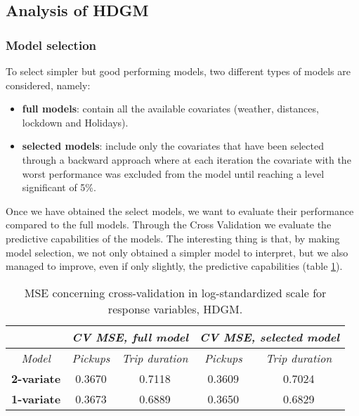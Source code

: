 
\subsection{Analysis of HDGM}
\subsubsection{Model selection} To select simpler but good performing models, two different types of models are considered, namely:
\begin{itemize}
	\item \textbf{full models}: contain all the available covariates (weather, distances, lockdown and Holidays).
	\item \textbf{selected models}: include only the covariates that have been selected through a backward approach where at each iteration the covariate with the worst performance was excluded from the model until reaching a level significant of \num{5}\%.
\end{itemize}
Once we have obtained the select models, we want to evaluate their performance compared to the full models. Through the Cross Validation we evaluate the predictive capabilities of the models. The interesting thing is that, by making model selection, we not only obtained a simpler model to interpret, but we also managed to improve, even if only slightly, the predictive capabilities (table \ref{Cross-validation mean squared errors HDGM}).
 
\begin{table}
	\centering
	\renewcommand\arraystretch{1.3}
	\begin{tabular}{c|cc|cc}
		\hline
		\multicolumn{1}{l|}{} & \multicolumn{2}{c|}{\textit{CV MSE, full model}} & \multicolumn{2}{c}{\textit{CV MSE, selected model} }\\ 
		\hline
		\textit{Model} & \multicolumn{1}{c|}{\textit{Pickups}} & \textit{Trip duration} & \multicolumn{1}{c|}{\textit{Pickups}} & \textit{Trip duration} \\ 
		\hline
		\textbf{2-variate } & \multicolumn{1}{c|}{0.3670}  & 0.7118   & \multicolumn{1}{c|}{0.3609}  & 0.7024   \\ 
		\hline
		\textbf{1-variate } & \multicolumn{1}{c|}{0.3673}  & 0.6889   & \multicolumn{1}{c|}{0.3650}  & 0.6829   \\ 
		\hline
	\end{tabular}
	\caption[MSE concerning cross-validation in log-standardized scale for response variables (HDGM)]{MSE concerning cross-validation in log-standardized scale for response variables, HDGM.}
	\label{Cross-validation mean squared errors HDGM}
\end{table}

